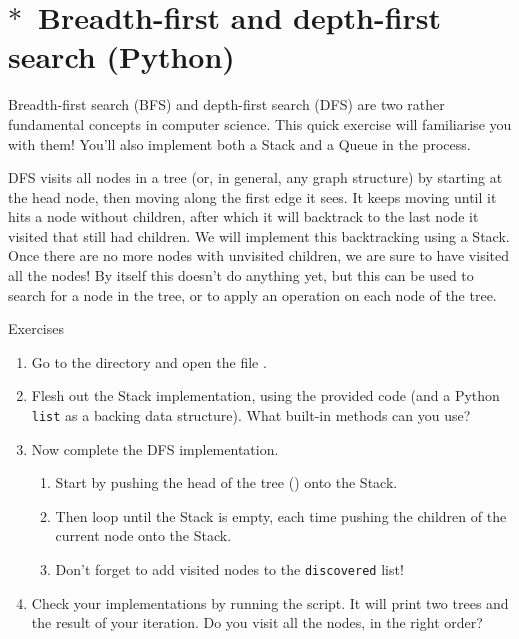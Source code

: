 \section{$\ast$~Breadth-first and depth-first search (Python)}

Breadth-first search (BFS) and depth-first search (DFS) are two rather fundamental concepts in computer science. This quick exercise will familiarise you with them! You'll also implement both a Stack and a Queue in the process.

DFS visits all nodes in a tree (or, in general, any graph structure) by starting at the head node, then moving along the first edge it sees. It keeps moving until it hits a node without children, after which it will backtrack to the last node it visited that still had children. We will implement this backtracking using a Stack. Once there are no more nodes with unvisited children, we are sure to have visited all the nodes! By itself this doesn't do anything yet, but this can be used to search for a node in the tree, or to apply an operation on each node of the tree.
%
\begin{mybox}{Exercises}
    \begin{enumerate}
        \item Go to the directory  and open the file .
        \item Flesh out the Stack implementation, using the provided code (and a Python \texttt{list} as a backing data structure). What built-in methods can you use?
        \item Now complete the DFS implementation.
        \begin{enumerate}
            \item Start by pushing the head of the tree () onto the Stack.
            \item Then loop until the Stack is empty, each time pushing the children of the current node onto the Stack.
            \item Don't forget to add visited nodes to the \texttt{discovered} list!
        \end{enumerate}
        \item Check your implementations by running the script. It will print two trees and the result of your iteration. Do you visit all the nodes, in the right order?
    \end{enumerate}
\end{mybox}
\clearpage


